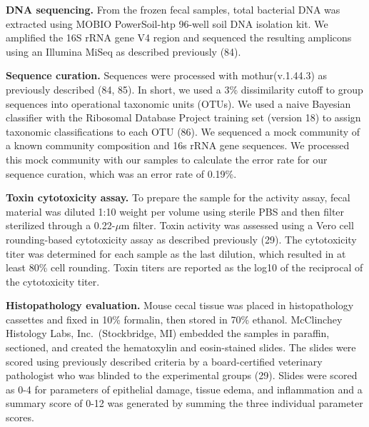 \documentclass[
  12pt,
]{article}
\begin{document}
\textbf{DNA sequencing.} From the frozen fecal samples, total bacterial
DNA was extracted using MOBIO PowerSoil-htp 96-well soil DNA isolation
kit. We amplified the 16S rRNA gene V4 region and sequenced the
resulting amplicons using an Illumina MiSeq as described previously
(84).

\textbf{Sequence curation.} Sequences were processed with
mothur(v.1.44.3) as previously described (84, 85). In short, we used a
3\% dissimilarity cutoff to group sequences into operational taxonomic
units (OTUs). We used a naive Bayesian classifier with the Ribosomal
Database Project training set (version 18) to assign taxonomic
classifications to each OTU (86). We sequenced a mock community of a
known community composition and 16s rRNA gene sequences. We processed
this mock community with our samples to calculate the error rate for our
sequence curation, which was an error rate of 0.19\%.

\textbf{Toxin cytotoxicity assay.} To prepare the sample for the
activity assay, fecal material was diluted 1:10 weight per volume using
sterile PBS and then filter sterilized through a 0.22-\(\mu\)m filter.
Toxin activity was assessed using a Vero cell rounding-based
cytotoxicity assay as described previously (29). The cytotoxicity titer
was determined for each sample as the last dilution, which resulted in
at least 80\% cell rounding. Toxin titers are reported as the log10 of
the reciprocal of the cytotoxicity titer.

\textbf{Histopathology evaluation.} Mouse cecal tissue was placed in
histopathology cassettes and fixed in 10\% formalin, then stored in 70\%
ethanol. McClinchey Histology Labs, Inc.~(Stockbridge, MI) embedded the
samples in paraffin, sectioned, and created the hematoxylin and
eosin-stained slides. The slides were scored using previously described
criteria by a board-certified veterinary pathologist who was blinded to
the experimental groups (29). Slides were scored as 0-4 for parameters
of epithelial damage, tissue edema, and inflammation and a summary score
of 0-12 was generated by summing the three individual parameter scores.
\end{document}
